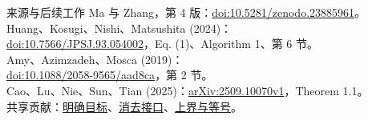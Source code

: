 \documentclass{beamer}
\begin{document}
\begin{frame}{来源与后续工作}
\small
Ma 与 Zhang，第 4 版：\href{https://doi.org/10.5281/zenodo.23885961}{doi:10.5281/zenodo.23885961}。\\[.5em]
Huang、Kosugi、Nishi、Matsushita (2024)：\\
\href{https://doi.org/10.7566/JPSJ.93.054002}{doi:10.7566/JPSJ.93.054002}，Eq. (1)、Algorithm 1、第 6 节。\\[.5em]
Amy、Azimzadeh、Mosca (2019)：\\
\href{https://doi.org/10.1088/2058-9565/aad8ca}{doi:10.1088/2058-9565/aad8ca}，第 2 节。\\[.5em]
Cao、Lu、Nie、Sun、Tian (2025)：\href{https://arxiv.org/abs/2509.10070v1}{arXiv:2509.10070v1}，Theorem 1.1。\\[.5em]
共享贡献：\href{https://github.com/the-omega-institute/trureturing-requests/issues/229}{明确目标}、\href{https://github.com/the-omega-institute/trureturing-requests/issues/230}{消去接口}、\href{https://github.com/the-omega-institute/trureturing-requests/issues/231}{上界与等号}。
\end{frame}
\FormalVerification
\end{document}
